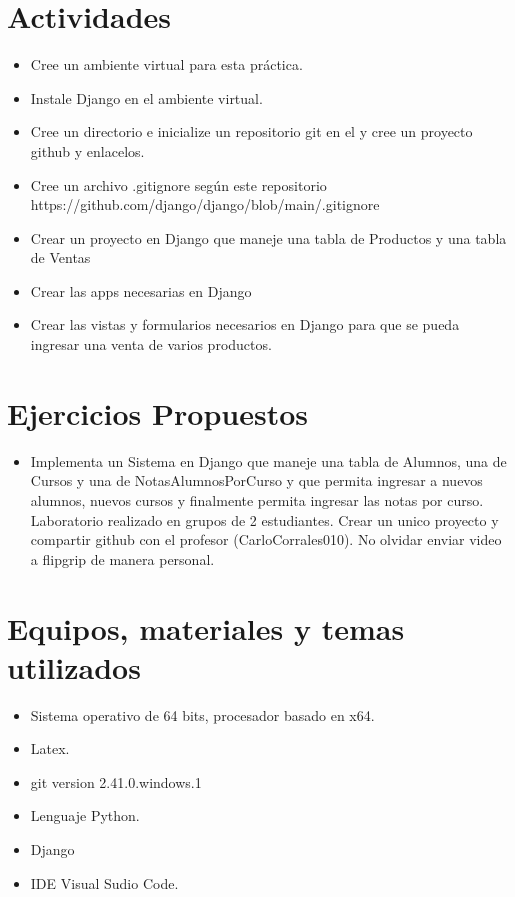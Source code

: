 \documentclass{article}
\begin{document}
	\section{Actividades}
	\begin{itemize}		
		\item Cree un ambiente virtual para esta práctica.
		\item	Instale Django en el ambiente virtual.
		\item	Cree un directorio e inicialize un repositorio git en el y cree un proyecto github y enlacelos.
		\item	Cree un archivo .gitignore según este repositorio \\
		https://github.com/django/django/blob/main/.gitignore
		\item	Crear un proyecto en Django que maneje una tabla de Productos y una tabla de Ventas
		\item	Crear las apps necesarias en Django
		\item	Crear las vistas y formularios necesarios en Django para que se pueda ingresar una venta de varios productos.
		
	\end{itemize}
	
	\section{Ejercicios Propuestos}
	\begin{itemize}	
	
		\item Implementa un Sistema en Django que maneje una tabla de Alumnos, una de Cursos y una de NotasAlumnosPorCurso y que permita ingresar a nuevos alumnos, nuevos cursos y finalmente permita ingresar las notas por curso.
		Laboratorio realizado en grupos de 2 estudiantes.  Crear un unico proyecto y compartir github con el profesor (CarloCorrales010).
		No olvidar enviar video a flipgrip de manera personal.
		
		
	\end{itemize}
	
	\section{Equipos, materiales y temas utilizados}
	\begin{itemize}
		\item Sistema operativo de 64 bits, procesador basado en x64.
		\item Latex. 
		\item git version 2.41.0.windows.1
		\item Lenguaje Python.
		\item Django
		\item IDE Visual Sudio Code.
	\end{itemize}
\end{document}
